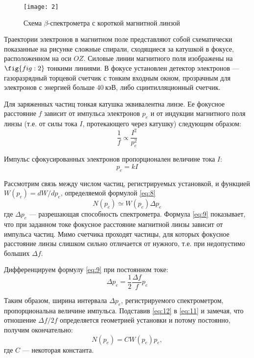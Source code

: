 \documentclass[a4paper, 12pt]{article}
\begin{document}
\begin{figure}[H]
    \texttt{[image: 2]} 
    \caption{Схема $\beta$-спектрометра с короткой магнитной линзой}
    \label{fig:2}
\end{figure}

Траектории электронов в магнитном поле представляют собой
схематически показанные на рисунке сложные спирали, сходящиеся за
катушкой в фокусе, расположенном на оси $OZ$. Силовые линии магнитного
поля изображены на $\fig{fig:2}$ тонкими линиями. В фокусе установлен
детектор электронов --- газоразрядный торцевой счетчик с тонким
входным окном, прозрачным для электронов с энергией больше $40\:
\text{кэВ}$, либо сцинтилляционный счетчик.

Для заряженных частиц тонкая катушка эквивалентна линзе. Ее фокусное
расстояние $f$ зависит от импульса электронов $p_e$ и от индукции
магнитного поля линзы (т.е. от силы тока $I$, протекающего через
катушку) следующим образом:
\begin{equation}
    \frac{1}{f} \propto \frac{I^2}{p_e^2}
    \label{eq:9}
\end{equation}

Импульс сфокусированных электронов пропорционален величине тока $I$:
\begin{equation}
    p_e = k I
    \label{eq:10}
\end{equation}

Рассмотрим связь между числом частиц, регистрируемых установкой, и
функцией $W (p_e) = dW / dp_e$, определяемой формулой \eqref{eq:8} 
\begin{equation}
    N (p_e) \simeq W (p_e) \Delta p_e
    \label{eq:11}
\end{equation}
где $\Delta p_e$ --- разрешающая способность спектрометра. Формула
\eqref{eq:9} показывает, что при заданном токе фокусное расстояние
магнитной линзы зависит от импульса частиц. Мимо счетчика проходят
частицы, для которых фокусное расстояние линзы слишком сильно
отличается от нужного, т.е. при недопустимо больших $\Delta f$.

Дифференцируем формулу \eqref{eq:9} при постоянном токе:
\begin{equation}
    \Delta p_e = \frac{1}{2} \frac{\Delta f}{f}p_e
    \label{eq:12}
\end{equation}

Таким образом, ширина интервала $\Delta p_e$, регистрируемого
спектрометром, пропорциональна величине импульса. Подставив
\eqref{eq:12} в \eqref{eq:11} и замечая, что отношение $\Delta f/ 2f$
определяется геометрией установки и потому постоянно, получим
окончательно:
\begin{equation}
    N (p_e) = C W (p_e) p_e,
    \label{eq:13}
\end{equation}
где $C$ --- некоторая константа.
\end{document}
